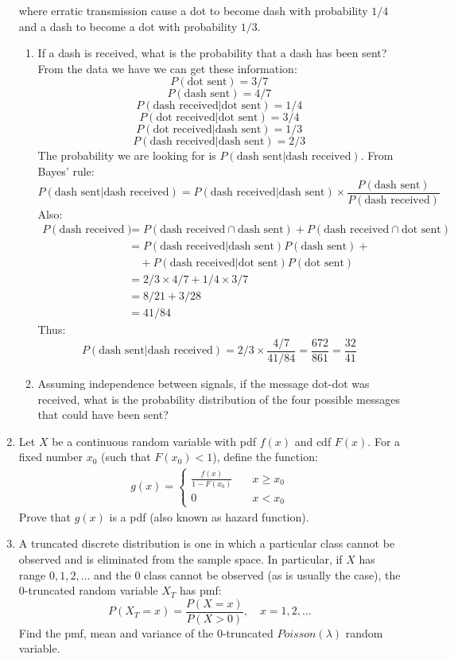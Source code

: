 \documentclass[a4paper]{article}
\begin{document}
\begin{enumerate}
  where erratic transmission cause a dot to become dash with probability $1/4$
  and a dash to become a dot with probability $1/3$.
    \begin{enumerate}
      \item If a dash is received, what is the probability that a dash has been
      sent?\\
      From the data we have we can get these information:
      $$P(\text{dot sent})=3/7$$
      $$P(\text{dash sent})=4/7$$
      $$P(\text{dash received}|\text{dot sent})=1/4$$
      $$P(\text{dot received}|\text{dot sent})=3/4$$
      $$P(\text{dot received}|\text{dash sent})=1/3$$
      $$P(\text{dash received}|\text{dash sent})=2/3$$
      The probability we are looking for is $P(\text{dash sent}|\text{dash
      received})$. From Bayes' rule:
      $$P(\text{dash sent}|\text{dash received})=P(\text{dash
      received}|\text{dash sent})\times\frac{P(\text{dash
      sent})}{P(\text{dash received})}$$
      Also:
      \begin{align}
      P(\text{dash received})&=P(\text{dash received}\cap\text{dash
      sent})+P(\text{dash received}\cap\text{dot sent})\nonumber\\
      &=P(\text{dash received}|\text{dash sent})P(\text{dash sent})+\nonumber\\
      &\quad+P(\text{dash received}|\text{dot sent})P(\text{dot sent})\nonumber\\
      &=2/3\times4/7+1/4\times3/7\nonumber\\
      &=8/21+3/28\nonumber\\
      &=41/84
      \end{align}
      Thus:
      $$P(\text{dash sent}|\text{dash
      received})=2/3\times\frac{4/7}{41/84}=\frac{672}{861}=\frac{32}{41}$$
      \item Assuming independence between signals, if the message dot-dot was
      received, what is the probability distribution of the four possible
      messages that could have been sent?
    \end{enumerate}
  \item Let $X$ be a continuous random variable with pdf $f(x)$ and cdf $F(x)$.
  For a fixed number $x_0$ (such that $F(x_0)<1$), define the function:
    \begin{align} g(x)=
      \begin{cases}
        \frac{f(x)}{1-F(x_0)} \quad &x\geq x_0 \\
        0 \quad &x<x_0
      \end{cases}
    \end{align}
  Prove that $g(x)$ is a pdf (also known as hazard function).
  \item A truncated discrete distribution is one in which a particular class
  cannot be observed and is eliminated from the sample space. In particular, if
  $X$ has range $0,1,2,\ldots$ and the $0$ class cannot be observed (as is
  usually the case), the $0$-truncated random variable $X_T$ has pmf:
  $$P(X_T=x)=\frac{P(X=x)}{P(X>0)}, \quad x=1,2,\ldots$$
  Find the pmf, mean and variance of the $0$-truncated $Poisson(\lambda)$ random
  variable.
\end{enumerate}
\end{document}
